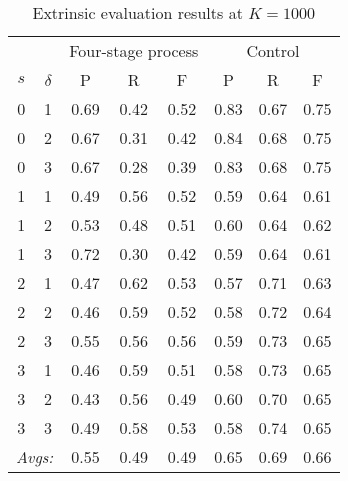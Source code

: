 {\begin{table}
{%
\fontsize{11pt}{12pt}\selectfont
\setlength{\extrarowheight}{2pt}
\centering
\begin{tabular}{cc|ccc|ccc}
\toprule
\multicolumn{2}{c}{} & \multicolumn{3}{c}{Four-stage process} & \multicolumn{3}{c}{Control} \\
$s$ & $\delta$ & P & R & F & P & R & F \\\hline %
0 & 1 & 0.69 & 0.42 & 0.52 & 0.83 & 0.67 & 0.75 \\
0 & 2 & 0.67 & 0.31 & 0.42 & 0.84 & 0.68 & 0.75 \\
0 & 3 & 0.67 & 0.28 & 0.39 & 0.83 & 0.68 & 0.75 \\\hline %
1 & 1 & 0.49 & 0.56 & 0.52 & 0.59 & 0.64 & 0.61 \\
1 & 2 & 0.53 & 0.48 & 0.51 & 0.60 & 0.64 & 0.62 \\
1 & 3 & 0.72 & 0.30 & 0.42 & 0.59 & 0.64 & 0.61 \\\hline %
2 & 1 & 0.47 & 0.62 & 0.53 & 0.57 & 0.71 & 0.63 \\
2 & 2 & 0.46 & 0.59 & 0.52 & 0.58 & 0.72 & 0.64 \\
2 & 3 & 0.55 & 0.56 & 0.56 & 0.59 & 0.73 & 0.65 \\\hline %
3 & 1 & 0.46 & 0.59 & 0.51 & 0.58 & 0.73 & 0.65 \\
3 & 2 & 0.43 & 0.56 & 0.49 & 0.60 & 0.70 & 0.65 \\
3 & 3 & 0.49 & 0.58 & 0.53 & 0.58 & 0.74 & 0.65 \\\hline 
 \multicolumn{2}{r|}{\textit{Avgs:}} & 0.55 & 0.49 & 0.49 & 0.65 & 0.69 & 0.66 \\\bottomrule
\end{tabular}
}
\caption{Extrinsic evaluation results at $K = 1000$}%
\label{tab:extr-results-1000}
\end{table}

}
